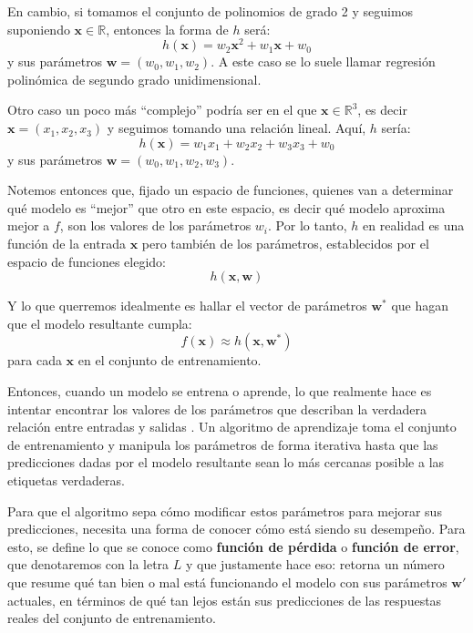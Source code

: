 \documentclass[../../main.tex]{subfiles}
\begin{document}
En cambio, si tomamos el conjunto de polinomios de grado 2 y seguimos suponiendo
\(\bm{x} \in \mathbb{R}\), entonces la forma de \(h\) será:
\[h(\bm{x}) = w_2 \bm{x}^2 + w_1 \bm{x} + w_0\] y sus parámetros
\(\bm{w}=(w_0, w_1, w_2)\). A este caso se lo suele llamar regresión polinómica de segundo
grado unidimensional.

Otro caso un poco más ``complejo'' podría ser en el que \(\bm{x} \in \mathbb{R}^3\), es decir
\(\bm{x}=(x_1, x_2, x_3)\) y seguimos tomando una relación lineal. Aquí, \(h\) sería:
\[h(\bm{x}) = w_1 x_1 + w_2 x_2 + w_3 x_3 + w_0\] y sus parámetros \(\bm{w}=(w_0, w_1,
w_2, w_3)\)\footnotemark. 

Notemos entonces que, fijado un espacio de funciones, quienes van a determinar qué modelo
es ``mejor'' que otro en este espacio, es decir qué modelo aproxima mejor a \(f\), son los
valores de los parámetros \(w_i\). Por lo tanto, \(h\) en realidad es una función de la
entrada \(\bm{x}\) pero también de los parámetros, establecidos por el espacio de funciones
elegido:
\[h(\bm{x}, \bm{w})\]

Y lo que querremos idealmente es hallar el vector de parámetros \(\bm{w}^*\) que hagan que
el modelo resultante cumpla:
\[f(\bm{x}) \approx h(\bm{x}, \bm{w}^*)\]
para cada \(\bm{x}\) en el conjunto de entrenamiento.

Entonces, cuando un modelo se entrena o aprende, lo que realmente hace es intentar
encontrar los valores de los parámetros que describan la verdadera relación entre entradas
y salidas \cite{prince2024understanding}. Un algoritmo de aprendizaje toma el conjunto de
entrenamiento y manipula los parámetros de forma iterativa hasta que las predicciones
dadas por el modelo resultante sean lo más cercanas posible a las etiquetas verdaderas.

Para que el algoritmo sepa cómo modificar estos parámetros para mejorar sus predicciones,
necesita una forma de conocer cómo está siendo su desempeño. Para esto, se define lo que se
conoce como \textbf{función de pérdida} o \textbf{función de error}, que denotaremos con
la letra \(L\) y que justamente hace eso: retorna un número que resume qué tan bien o mal
está funcionando el modelo con sus parámetros \(\bm{w}'\) actuales, en términos de qué tan
lejos están sus predicciones de las respuestas reales del conjunto de entrenamiento.
\end{document}
